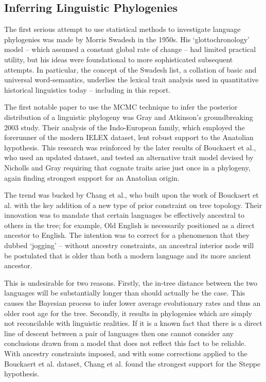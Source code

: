 \documentclass[10pt,journal,compsoc]{IEEEtran}
\begin{document}
\subsection{Inferring Linguistic Phylogenies}

The first serious attempt to use statistical methods to investigate language phylogenies was made by Morris Swadesh in the 1950s. His `glottochronology' model -- which assumed a constant global rate of change -- had limited practical utility, but his ideas were foundational to more sophisticated subsequent attempts\cite{swadesh1955towards}. In particular, the concept of the Swadesh list, a collation of basic and universal word-semantics, underlies the lexical trait analysis used in quantitative historical linguistics today -- including in this report.

The first notable paper to use the MCMC technique to infer the posterior distribution of a linguistic phylogeny was Gray and Atkinson's groundbreaking 2003 study. Their analysis of the Indo-European family, which employed the forerunner of the modern IELEX dataset, lent robust support to the Anatolian hypothesis.\cite{gray2003language} This research was reinforced by the later results of Bouckaert et al.\cite{bouckaert2012mapping}\cite{bouckaert2013correction}, who used an updated dataset, and tested an alternative trait model devised by Nicholls and Gray\cite{nicholls2008dated} requiring that cognate traits arise just once in a phylogeny, again finding strongest support for an Anatolian origin.

The trend was bucked by Chang et al., who built upon the work of Bouckaert et al. with the key addition of a new type of  prior constraint on tree topology. Their innovation was to mandate that certain languages be effectively ancestral to others in the tree; for example, Old English is necessarily positioned as a direct ancestor to English. The intention was to correct for a phenomenon that they dubbed `jogging' -- without ancestry constraints, an ancestral interior node will be postulated that is older than both a modern language and its more ancient ancestor\cite{chang2015ancestry}.

This is undesirable for two reasons. Firstly, the in-tree distance between the two languages will be substantially longer than should actually be the case. This causes the Bayesian process to infer lower average evolutionary rates and thus an older root age for the tree. Secondly, it results in phylogenies which are simply not reconcilable with linguistic realities. If it is a known fact that there is a direct line of descent between a pair of languages then one cannot consider any conclusions drawn from a model that does not reflect this fact to be reliable. With ancestry constraints imposed, and with some corrections applied to the Bouckaert et al. dataset, Chang et al. found the strongest support for the Steppe hypothesis.
\end{document}
